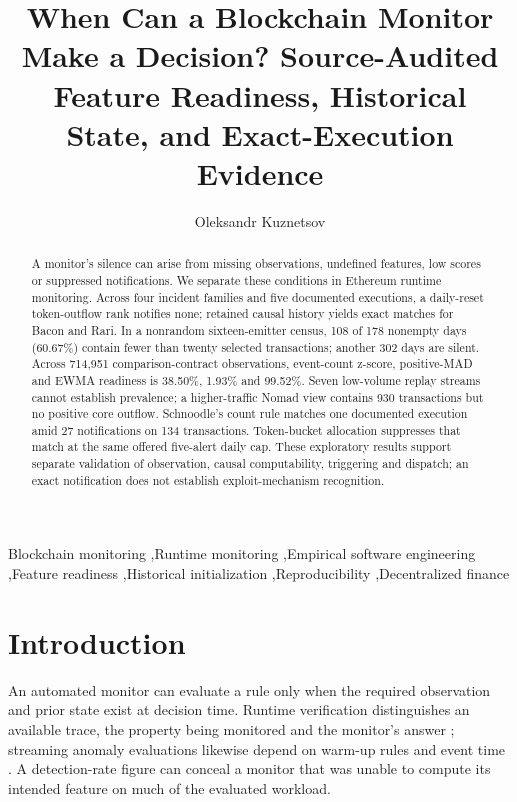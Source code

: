\documentclass[preprint,12pt,authoryear]{elsarticle}
\begin{document}
\begin{frontmatter}
\title{When Can a Blockchain Monitor Make a Decision? Source-Audited Feature Readiness, Historical State, and Exact-Execution Evidence}
\author[aff1,aff2]{Oleksandr Kuznetsov}
\address[aff1]{Department of Theoretical and Applied Sciences, eCampus University, Italy}
\address[aff2]{Department of Intelligent Software Systems and Technologies, School of Computer Science and Artificial Intelligence, V.~N. Karazin Kharkiv National University, Ukraine}
\begin{abstract}
A monitor's silence can arise from missing observations, undefined features, low scores or suppressed notifications. We separate these conditions in Ethereum runtime monitoring. Across four incident families and five documented executions, a daily-reset token-outflow rank notifies none; retained causal history yields exact matches for Bacon and Rari. In a nonrandom sixteen-emitter census, 108 of 178 nonempty days (60.67\%) contain fewer than twenty selected transactions; another 302 days are silent. Across 714,951 comparison-contract observations, event-count z-score, positive-MAD and EWMA readiness is 38.50\%, 1.93\% and 99.52\%. Seven low-volume replay streams cannot establish prevalence; a higher-traffic Nomad view contains 930 transactions but no positive core outflow. Schnoodle's count rule matches one documented execution amid 27 notifications on 134 transactions. Token-bucket allocation suppresses that match at the same offered five-alert daily cap. These exploratory results support separate validation of observation, causal computability, triggering and dispatch; an exact notification does not establish exploit-mechanism recognition.
\end{abstract}
\begin{keyword}
Blockchain monitoring \sep Runtime monitoring \sep Empirical software engineering \sep Feature readiness \sep Historical initialization \sep Reproducibility \sep Decentralized finance
\end{keyword}
\end{frontmatter}

\section{Introduction}\label{sec:intro}
An automated monitor can evaluate a rule only when the required observation and prior state exist at decision time. Runtime verification distinguishes an available trace, the property being monitored and the monitor's answer \citep{Leucker2009RV,Bauer2011RV}; streaming anomaly evaluations likewise depend on warm-up rules and event time \citep{Lavin2015NAB}. A detection-rate figure can conceal a monitor that was unable to compute its intended feature on much of the evaluated workload.
\end{document}
